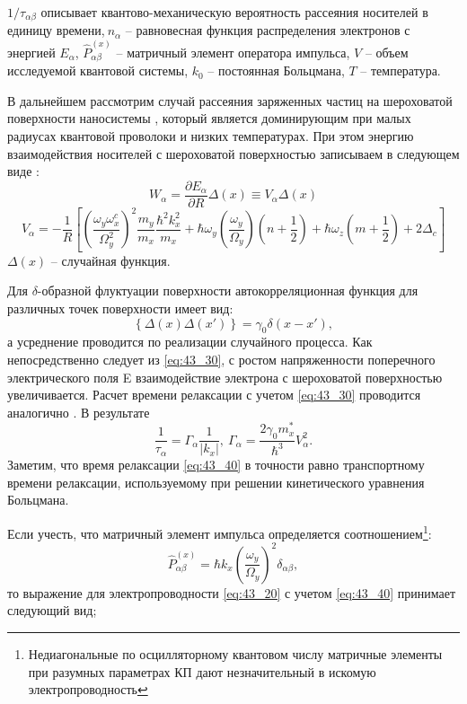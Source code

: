 ${1}/{{\tau }_{\alpha \beta }}$ описывает квантово-механическую вероятность рассеяния носителей в единицу времени,$\ n_{\alpha }$ -- равновесная функция распределения электронов с энергией $E_{\alpha }$, ${\hat{P}}^{\left(x\right)}_{\alpha \beta }$ -- матричный элемент оператора импульса, $V$ -- объем исследуемой квантовой системы, $k_0$ --  постоянная Больцмана, $T$ --  температура.

В дальнейшем рассмотрим случай рассеяния заряженных частиц на шероховатой поверхности наносистемы \cite{Sakaki1987},  который является доминирующим при малых радиусах квантовой проволоки и низких температурах. При этом энергию взаимодействия носителей с шероховатой поверхностью записываем в следующем виде \cite{Sakaki1987,Motohisa1992}:
\begin{equation} \label{eq:43_30} 
W_{\alpha }=\frac{\partial E_{\alpha }}{\partial R}\Delta \left(x\right)\equiv V_{\alpha }\Delta \left(x\right) 
\end{equation}
\[
V_{\alpha }=-\frac{1}{R}\left[{\left(\frac{{\omega }_y{\omega }^c_x}{{\Omega }^2_y}\right)}^2\frac{m_y}{m_x}\frac{{\hbar }^2k^2_x}{m_x}+\hbar {\omega }_y\left(\frac{{\omega }_y}{{\Omega }_y}\right)\left(n+\frac{1}{2}\right)+\hbar {\omega }_z\left(m+\frac{1}{2}\right)+2{\Delta }_c\right]
\] 
$\Delta \left(x\right)$ -- случайная функция.

Для $\delta $-образной флуктуации поверхности автокорреляционная функция для различных точек поверхности имеет вид:
\[
\left\{\Delta \left(x\right)\Delta \left(x'\right)\right\}={\gamma }_0\delta \left(x-x'\right),
\] 
а усреднение проводится по реализации случайного процесса.  Как непосредственно следует из \eqref{eq:43_30}, с ростом напряженности поперечного электрического поля E взаимодействие электрона с шероховатой поверхностью увеличивается. Расчет времени релаксации с учетом \eqref{eq:43_30} проводится аналогично \cite{Karapetyan2011}. В результате
\begin{equation} \label{eq:43_40} 
\frac{1}{{\tau }_{\alpha }}={\Gamma }_{\alpha }\frac{1}{\left|k_x\right|},\ {\Gamma }_{\alpha }=\frac{2{\gamma }_0m^*_x}{{\hbar }^3}V^2_{\alpha }.  
\end{equation}
Заметим, что время релаксации \eqref{eq:43_40} в точности равно транспортному времени релаксации, используемому при решении кинетического уравнения Больцмана.

Если учесть, что матричный элемент импульса определяется соотношением\footnote{Недиагональные по осцилляторному квантовом числу матричные элементы при разумных параметрах КП дают незначительный в искомую электропроводность}:
\[
{\hat{P}}^{\left(x\right)}_{\alpha \beta }=\hbar k_x{\left(\frac{{\omega }_y}{{\Omega }_y}\right)}^2{\delta }_{\alpha \beta },
\] 
то выражение для электропроводности \eqref{eq:43_20} с учетом \eqref{eq:43_40} принимает следующий вид;

